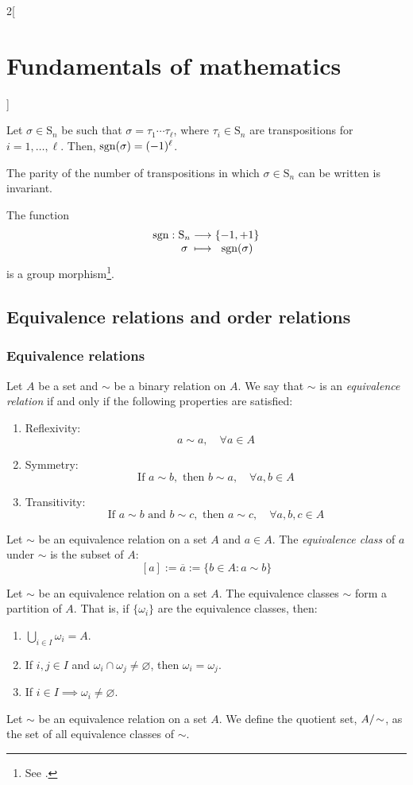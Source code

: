 \documentclass[../../../main_math.tex]{subfiles}
\begin{document}
\begin{multicols}{2}[\section{Fundamentals of mathematics}]
\begin{corollary}
    Let $\sigma\in \text{S}_n$ be such that $\sigma=\tau_1\cdots\tau_\ell$, where $\tau_i\in \text{S}_n$ are transpositions for $i=1,\ldots,\ell$. Then, $\operatorname{sgn}(\sigma)=(-1)^\ell$.
  \end{corollary}
  \begin{corollary}
    The parity of the number of transpositions in which $\sigma\in \text{S}_n$ can be written is invariant.
  \end{corollary}
  \begin{corollary}
    The function
    $$\function{\sign}{\text{S}_n}{\{-1,+1\}}{\sigma}{\sign(\sigma)}$$
    is a group morphism\footnote{See .}.
  \end{corollary}
  \subsection{Equivalence relations and order relations}
  \subsubsection{Equivalence relations}
  \begin{definition}
    Let $A$ be a set and $\sim$ be a binary relation on $A$. We say that $\sim$ is an \emph{equivalence relation} if and only if the following properties are satisfied:
    \begin{enumerate}
      \item Reflexivity: $$a\sim a,\quad\forall a\in A$$
      \item Symmetry: $$\text{If }a\sim b, \text{ then }b\sim a,\quad\forall a,b\in A$$
      \item Transitivity:
            $$\text{If }a\sim b\text{ and }b\sim c,\text{ then }a\sim c,\quad\forall a,b,c\in A$$
    \end{enumerate}
  \end{definition}
  \begin{definition}
    Let $\sim$ be an equivalence relation on a set $A$ and $a\in A$. The \emph{equivalence class} of $a$ under $\sim$ is the subset of $A$: $$[a]:=\overline{a}:=\{b\in A: a\sim b\}$$
  \end{definition}
  \begin{theorem}
    Let $\sim$ be an equivalence relation on a set $A$. The equivalence classes $\sim$ form a partition of $A$. That is, if $\{\omega_i\}$ are the equivalence classes, then:
    \begin{enumerate}
      \item $\bigcup_{i\in I} \omega_i=A$.
      \item If $i,j\in I$ and $\omega_i\cap\omega_j\ne\varnothing$, then $\omega_i=\omega_j$.
      \item If $i\in I\implies\omega_i\ne\varnothing$.
    \end{enumerate}
  \end{theorem}
  \begin{definition}
    Let $\sim$ be an equivalence relation on a set $A$. We define the quotient set, $\quot{A}{\!\sim}$, as the set of all equivalence classes of $\sim$.
  \end{definition}

\end{multicols}
\end{document}

